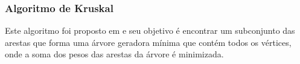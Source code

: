 \begin{figure}[!ht]
	\centering
\end{figure}
\begin{figure}[!ht]
	\centering
\end{figure}

\subsubsection{Algoritmo de Kruskal}
Este algoritmo foi proposto em \cite{kruskal} e seu objetivo é encontrar um subconjunto das arestas que forma uma árvore geradora mínima que contém todos os vértices, onde a soma dos pesos das arestas da árvore é minimizada.

